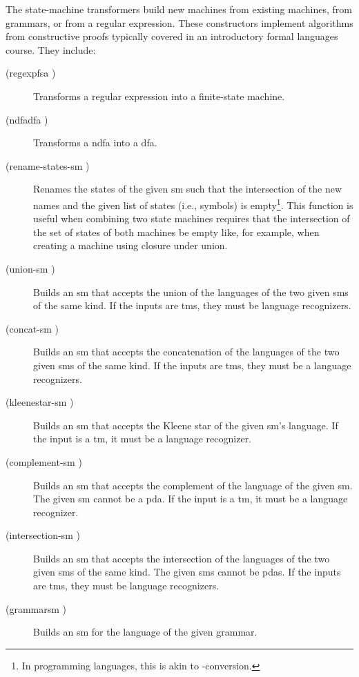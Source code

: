 \documentclass{eptcs}
\begin{document}
The state-machine transformers build new machines from existing machines, from grammars, or from a regular expression. These constructors implement algorithms from constructive proofs typically covered in an introductory formal languages course. They include:
\begin{description}
   \item [(regexpfsa )] Transforms a regular expression into a finite-state machine.

   \item [(ndfadfa )] Transforms a \textsf{ndfa} into a \textsf{dfa}.

   \item [(rename-states-sm  )] Renames the states of the given \textsf{sm} such that the intersection of the new names and the given list of states (i.e., symbols) is empty\footnote{In programming languages, this is akin to -conversion.}. This function is useful when combining two state machines requires that the intersection of the set of states of both machines be empty like, for example, when creating a machine using closure under union.

   \item [(union-sm  )] Builds an \textsf{sm} that accepts the union of the languages of the two given \textsf{sm}s of the same kind. If the inputs are \textsf{tm}s, they must be language recognizers.

   \item [(concat-sm  )] Builds an \textsf{sm} that accepts the concatenation of the languages of the two given \textsf{sm}s of the same kind. If the inputs are \textsf{tm}s, they must be a language recognizers.

   \item [(kleenestar-sm )] Builds an \textsf{sm} that accepts the Kleene star of the given \textsf{sm}'s language. If the input is a \textsf{tm}, it must be a language recognizer.

   \item [(complement-sm )] Builds an \textsf{sm} that accepts the complement of the language of the given \textsf{sm}. The given \textsf{sm} cannot be a \textsf{pda}. If the input is a \textsf{tm}, it must be a language recognizer.

   \item [(intersection-sm  )] Builds an \textsf{sm} that accepts the intersection of the languages of the two given \textsf{sm}s of the same kind. The given \textsf{sm}s cannot be \textsf{pda}s. If the inputs are \textsf{tm}s, they must be language recognizers.

   \item [(grammarsm )] Builds an \textsf{sm} for the language of the given grammar.
\end{description}
\end{document}
